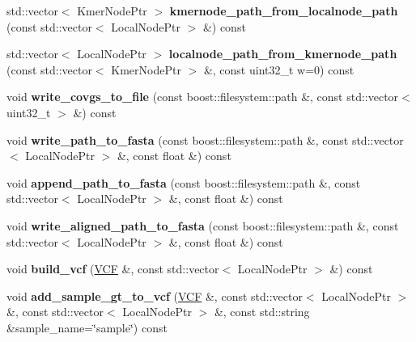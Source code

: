 \begin{DoxyCompactItemize}
\mbox{\label{classLocalPRG_a73008cf730eb3c8f4ebb15850a056430}} 
std\+::vector$<$ Kmer\+Node\+Ptr $>$ {\bfseries kmernode\+\_\+path\+\_\+from\+\_\+localnode\+\_\+path} (const std\+::vector$<$ Local\+Node\+Ptr $>$ \&) const
\item 
\mbox{\label{classLocalPRG_a28119980b89df2c53712298451289f00}} 
std\+::vector$<$ Local\+Node\+Ptr $>$ {\bfseries localnode\+\_\+path\+\_\+from\+\_\+kmernode\+\_\+path} (const std\+::vector$<$ Kmer\+Node\+Ptr $>$ \&, const uint32\+\_\+t w=0) const
\item 
\mbox{\label{classLocalPRG_a1869125941195fc0546e972281931839}} 
void {\bfseries write\+\_\+covgs\+\_\+to\+\_\+file} (const boost\+::filesystem\+::path \&, const std\+::vector$<$ uint32\+\_\+t $>$ \&) const
\item 
\mbox{\label{classLocalPRG_a02cfae8a258d05fb0f0883702a61d027}} 
void {\bfseries write\+\_\+path\+\_\+to\+\_\+fasta} (const boost\+::filesystem\+::path \&, const std\+::vector$<$ Local\+Node\+Ptr $>$ \&, const float \&) const
\item 
\mbox{\label{classLocalPRG_ad53a06335e970239bae28ea38a06193f}} 
void {\bfseries append\+\_\+path\+\_\+to\+\_\+fasta} (const boost\+::filesystem\+::path \&, const std\+::vector$<$ Local\+Node\+Ptr $>$ \&, const float \&) const
\item 
\mbox{\label{classLocalPRG_aae75df1603fddd25ff06f4fdab369fec}} 
void {\bfseries write\+\_\+aligned\+\_\+path\+\_\+to\+\_\+fasta} (const boost\+::filesystem\+::path \&, const std\+::vector$<$ Local\+Node\+Ptr $>$ \&, const float \&) const
\item 
\mbox{\label{classLocalPRG_ac4f8dfb2555af538ac2b89a7b414788f}} 
void {\bfseries build\+\_\+vcf} (\hyperlink{classVCF}{V\+CF} \&, const std\+::vector$<$ Local\+Node\+Ptr $>$ \&) const
\item 
\mbox{\label{classLocalPRG_a989f2128badfd99b3600d99b21dfa9e6}} 
void {\bfseries add\+\_\+sample\+\_\+gt\+\_\+to\+\_\+vcf} (\hyperlink{classVCF}{V\+CF} \&, const std\+::vector$<$ Local\+Node\+Ptr $>$ \&, const std\+::vector$<$ Local\+Node\+Ptr $>$ \&, const std\+::string \&sample\+\_\+name=\char`\"{}sample\char`\"{}) const

\end{DoxyCompactItemize}
